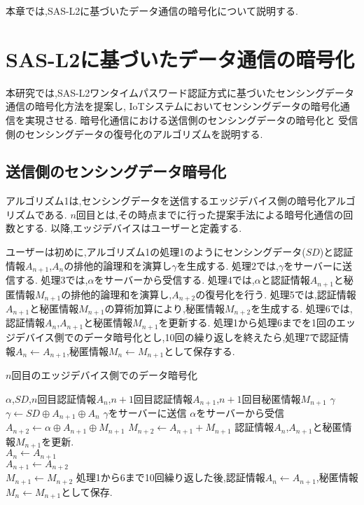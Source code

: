
本章では,SAS-L2に基づいたデータ通信の暗号化について説明する.
\section{SAS-L2に基づいたデータ通信の暗号化}
本研究では,SAS-L2ワンタイムパスワード認証方式に基づいたセンシングデータ通信の暗号化方法を提案し,
IoTシステムにおいてセンシングデータの暗号化通信を実現させる.
暗号化通信における送信側のセンシングデータの暗号化と
受信側のセンシングデータの復号化のアルゴリズムを説明する.

\subsection{送信側のセンシングデータ暗号化}
アルゴリズム1は,センシングデータを送信するエッジデバイス側の暗号化アルゴリズムである.
$n$回目とは,その時点までに行った提案手法による暗号化通信の回数とする.
以降,エッジデバイスはユーザーと定義する.

ユーザーは初めに,アルゴリズム1の処理1のようにセンシングデータ($SD$)と認証情報$A_{n+1}$,$A_n$の排他的論理和を演算し$\gamma$を生成する.
処理2では,$\gamma$をサーバーに送信する.
処理3では,$\alpha$をサーバーから受信する.
処理4では,$\alpha$と認証情報$A_{n+1}$と秘匿情報$M_{n+1}$の排他的論理和を演算し,$A_{n+2}$の復号化を行う.
処理5では,認証情報$A_{n+1}$と秘匿情報$M_{n+1}$の算術加算により,秘匿情報$M_{n+2}$を生成する.
処理6では,認証情報$A_n$,$A_{n+1}$と秘匿情報$M_{n+1}$を更新する.
処理1から処理6までを1回のエッジデバイス側でのデータ暗号化とし,10回の繰り返しを終えたら,処理7で認証情報$A_n \leftarrow A_{n+1}$,秘匿情報$M_n \leftarrow M_{n+1}$として保存する.
\begin{algorithm}[H]
\caption{$n$回目のエッジデバイス側でのデータ暗号化}
\begin{algorithmic}[1]
\renewcommand{\algorithmicrequire}{\textbf{Input:}}
\renewcommand{\algorithmicensure}{\textbf{Output:}}
\REQUIRE $\alpha$,$SD$,$n$回目認証情報$A_n$,$n+1$回目認証情報$A_{n+1}$,$n+1$回目秘匿情報$M_{n+1}$
\ENSURE $\gamma$
\STATE $\gamma \leftarrow SD \oplus A_{n+1} \oplus A_n$
\STATE $\gamma$をサーバーに送信
\STATE $\alpha$をサーバーから受信
\STATE $A_{n+2} \leftarrow \alpha \oplus A_{n+1} \oplus M_{n+1}$
\STATE $M_{n+2} \leftarrow A_{n+1} + M_{n+1}$
\STATE 認証情報$A_n$,$A_{n+1}$と秘匿情報$M_{n+1}$を更新.
\\ $A_n \leftarrow A_{n+1}$
\\ $A_{n+1} \leftarrow A_{n+2}$
\\ $M_{n+1} \leftarrow M_{n+2}$
\STATE 処理1から6まで10回繰り返した後,認証情報$A_n \leftarrow A_{n+1}$,秘匿情報$M_n \leftarrow M_{n+1}$として保存.
\end{algorithmic} 
\end{algorithm}


